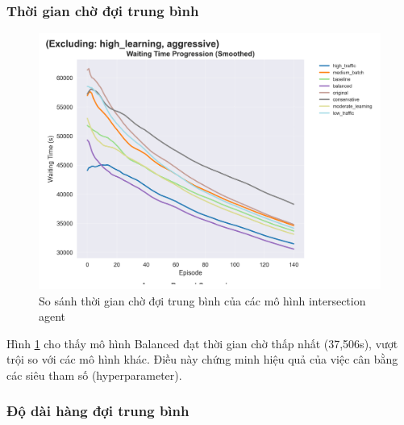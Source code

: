 \subsubsection{Thời gian chờ đợi trung bình}

\begin{figure}[!htp]
    \centering
    \includegraphics[width=\textwidth]{
        figures/individual_plots/intersection_filtered_waiting_time.png
    }
    \caption{So sánh thời gian chờ đợi trung bình của các mô hình intersection
    agent}
    \label{fig:intersection_filtered_waiting_time}
\end{figure}

Hình \ref{fig:intersection_filtered_waiting_time} cho thấy mô hình Balanced đạt thời
gian chờ thấp nhất (37,506s), vượt trội so với các mô hình khác. Điều này chứng minh
hiệu quả của việc cân bằng các siêu tham số (hyperparameter).

\subsubsection{Độ dài hàng đợi trung bình}

